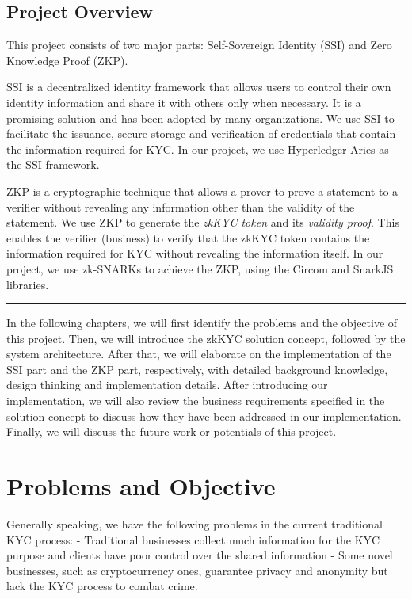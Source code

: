 \documentclass[
]{report}
\begin{document}
\section{Project Overview}

This project consists of two major parts: Self-Sovereign
Identity (SSI) and Zero Knowledge Proof (ZKP).

SSI is a decentralized identity framework that allows users to control
their own identity information and share it with others only when
necessary. It is a promising solution and has been adopted by many
organizations. We use SSI to facilitate the issuance, secure storage and
verification of credentials that contain the information required for
KYC. In our project, we use Hyperledger Aries as the SSI framework.

ZKP is a cryptographic technique that allows a prover to prove a
statement to a verifier without revealing any information other than the
validity of the statement. We use ZKP to generate the \emph{zkKYC token}
and its \emph{validity proof}. This enables the verifier (business) to
verify that the zkKYC token contains the information required for KYC
without revealing the information itself. In our project, we use
zk-SNARKs to achieve the ZKP, using the Circom and SnarkJS libraries.

\begin{center}\rule{0.5\linewidth}{0.5pt}\end{center}

In the following chapters, we will first identify the problems and the
objective of this project. Then, we will introduce the zkKYC solution
concept, followed by the system architecture. After that, we will
elaborate on the implementation of the SSI part and the ZKP part,
respectively, with detailed background knowledge, design thinking
and implementation details. After introducing our implementation, we
will also review the business requirements specified in the solution
concept to discuss how they have been addressed in our implementation.
Finally, we will discuss the future work or potentials of this project.

\chapter{Problems and Objective}

Generally speaking, we have the following problems in the current
traditional KYC process: - Traditional businesses collect much
information for the KYC purpose and clients have poor control over the
shared information - Some novel businesses, such as cryptocurrency ones,
guarantee privacy and anonymity but lack the KYC process to combat crime.
\end{document}
